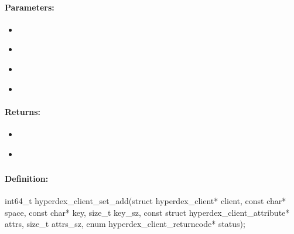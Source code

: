 \paragraph{Parameters:}
\begin{itemize}[noitemsep]
\item {}\\

\item {}\\

\item {}\\

\item {}\\

\end{itemize}

\paragraph{Returns:}
\begin{itemize}[noitemsep]
\item {}\\

\item {}\\

\end{itemize}

\pagebreak
\subsubsection{}
\label{api:c:set_add}


\paragraph{Definition:}
\begin{ccode}
int64_t hyperdex_client_set_add(struct hyperdex_client* client,
        const char* space,
        const char* key, size_t key_sz,
        const struct hyperdex_client_attribute* attrs, size_t attrs_sz,
        enum hyperdex_client_returncode* status);
\end{ccode}

